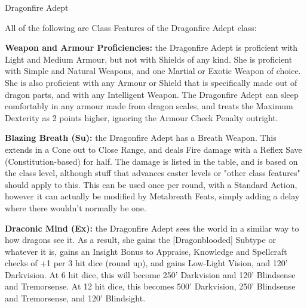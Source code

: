 \modebab{}
\goodfor{}
\goodref{}
\goodwil{}

\begin{extraclasstable}{Dragonfire Adept}{}
\end{extraclasstable}

\ClassFeatures
All of the following are Class Features of the Dragonfire Adept class:

\textbf{Weapon and Armour Proficiencies:} the Dragonfire Adept is proficient with Light and Medium Armour, but not with Shields of any kind. She is proficient with Simple and Natural Weapons, and one Martial or Exotic Weapon of choice. She is also proficient with any Armour or Shield that is specifically made out of dragon parts, and with any Intelligent Weapon. The Dragonfire Adept can sleep comfortably in any armour made from dragon scales, and treats the Maximum Dexterity as 2 points higher, ignoring the Armour Check Penalty outright. 

\textbf{Blazing Breath (Su):} the Dragonfire Adept has a Breath Weapon. This extends in a Cone out to Close Range, and deals Fire damage with a Reflex Save (Constitution-based) for half. The damage is listed in the table, and is based on the class level, although stuff that advances caster levels or "other class features" should apply to this. This can be used once per round, with a Standard Action, however it can actually be modified by Metabreath Feats, simply adding a delay where there wouldn't normally be one. 

\textbf{Draconic Mind (Ex):} the Dragonfire Adept sees the world in a similar way to how dragons see it. As a result, she gains the [Dragonblooded] Subtype or whatever it is, gains an Insight Bonus to Appraise, Knowledge and Spellcraft checks of +1 per 3 hit dice (round up), and gains Low-Light Vision, and 120' Darkvision. At 6 hit dice, this will become 250' Darkvision and 120' Blindsense and Tremorsense. At 12 hit dice, this becomes 500' Darkvision, 250' Blindsense and Tremorsense, and 120' Blindsight. 

